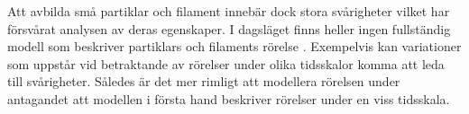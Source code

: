 Att avbilda små partiklar och filament innebär dock stora svårigheter vilket har försvårat analysen av deras egenskaper. I dagsläget finns heller ingen fullständig modell som beskriver partiklars och filaments rörelse \cite{Hofling&Franosch2013,}.  
Exempelvis kan variationer som uppstår vid betraktande av rörelser under olika tidsskalor komma att leda till svårigheter.
Således är det mer rimligt att modellera rörelsen under antagandet att modellen i första hand beskriver rörelser under en viss tidsskala.












